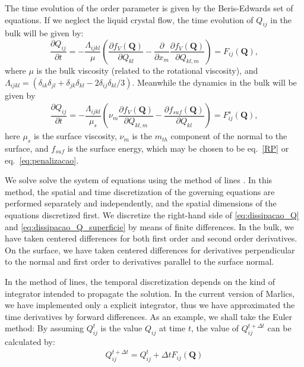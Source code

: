 \documentclass[final,5p,times,twocolumn]{elsarticle}
\begin{document}
The time evolution of the order parameter is given by the
Beris-Edwards set of equations. If we neglect the liquid crystal flow,
the time evolution of $Q_{ij}$ in the bulk will be given by:
\begin{equation} \label{eq:dissipacao_Q}
\dfrac{\partial Q_{ij}}{ \partial t} = -\dfrac{\Lambda_{ijkl}}{\mu} \left( \dfrac{\partial f_{V}(\mathbf{Q})}{\partial Q_{kl}} - \dfrac{\partial}{\partial x_m } \dfrac{\partial f_V(\mathbf{Q})}{\partial Q_{kl,m}}  \right)=F_{ij}(\mathbf{Q}),
\end{equation}
%
where $\mu$ is the bulk viscosity (related to the rotational viscosity), and $ \Lambda_{ijkl} = (\delta_{ik} \delta_{jl}+\delta_{jk} \delta_{kl}-2 \delta_{ij} \delta_{kl}/3)$. Meanwhile the dynamics in the bulk will be given by
\begin{align}\label{eq:dissipacao_Q_superficie}
\dfrac{\partial Q_{ij}}{\partial t}=-\dfrac{\Lambda_{ijkl}}{\mu_s}\left(\nu_m\dfrac{\partial f_{V}(\mathbf{Q})}{\partial Q_{kl,m}} -\dfrac{\partial f_{suf}(\mathbf{Q})}{\partial Q_{kl}}\right)=F^s_{ij}(\mathbf{Q}),
\end{align}
here $\mu_s$ is the surface viscosity, $\nu_m$ is the $m_{th}$ component of the normal to the surface, and $f_{suf}$ is the surface energy, which may be chosen to be eq.~\eqref{RP} or eq.~\eqref{eq:penalizacao}.

We solve solve the system of equations using the method of lines
\cite{Bhattacharjee2008}. In this method, the spatial and time
discretization of the governing equations are performed separately and
independently, and the spatial dimensions of the equations
discretized first.  We discretize the right-hand side of
\eqref{eq:dissipacao_Q} and
\eqref{eq:dissipacao_Q_superficie} by means of finite differences. In the bulk, we have taken centered differences for both first order and second
order derivatives. On the surface, we have taken centered differences
for derivatives perpendicular to the normal and first order to
derivatives parallel to the surface normal.

In the method of lines, the temporal discretization depends on the
kind of integrator intended to propagate the solution. In the current
version of Marlics, we have implemented only a explicit integrator,
thus we have approximated the time derivatives by forward differences.
As an example, we shall take the Euler method: By assuming $Q^t_{ij}$ is
the value $Q_{ij}$ at time $t$, the value of $Q^{t+\Delta t}_{ij}$ can
be calculated by:
\begin{align}
  Q^{t+\Delta t}_{ij}=Q^{t}_{ij}+ \Delta t F_{ij}(\mathbf{Q})
\end{align}
\end{document}
